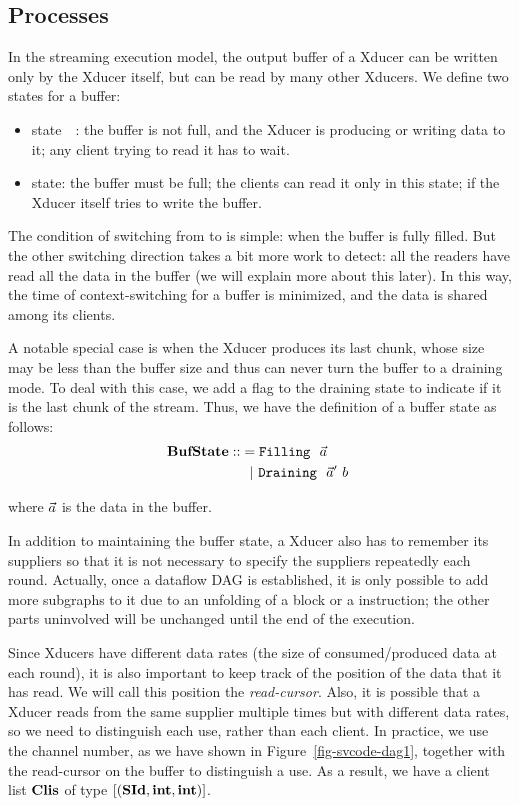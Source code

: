 \subsection{Processes}
In the streaming execution model, the output buffer of a Xducer can be written only by the Xducer itself, but can be read by many other Xducers. 
We define two states for a buffer:
\begin{itemize}
	\item \filling state　: the buffer is not full, and the Xducer is producing or writing data to it; any client trying to read it has to wait.

	\item \draining state: the buffer must be full; the clients can read it only in this state; if the Xducer itself tries to write the buffer.
\end{itemize}

The condition of switching from \filling to \draining is simple: when the buffer is fully filled. 
But the other switching direction takes a bit more work to detect: all the readers have read all the data in the buffer (we will explain more about this later).
In this way, the time of context-switching for a buffer is minimized, and the data is shared among its clients.


A notable special case is when the Xducer produces its last chunk, whose size may be less than the buffer size and thus can never turn the buffer to a draining mode.
To deal with this case, we add a flag to the draining state to indicate if it is the last chunk of the stream. 
Thus, we have the definition of a buffer state as follows:
\begin{align*}
	\mathbf{BufState} :: & = \texttt{Filling} \  \ \vec a \\
	          & \ \ | \ \texttt{Draining} \  \ \vec a' \ b \
\end{align*}

where $\vec a$ is the data in the buffer.

In addition to maintaining the buffer state, a Xducer also has to remember its suppliers so that it is not necessary to specify the suppliers repeatedly each round. 
Actually, once a dataflow DAG is established, it is only possible to add more subgraphs to it due to an unfolding of a \wc block or a \sc instruction; the other parts uninvolved will be unchanged until the end of the execution.


Since Xducers have different data rates (the size of consumed/produced data at each round), it is also important to keep track of the position of the data that it has read.
We will call this position the \emph{read-cursor}.
Also, it is possible that a Xducer reads from the same supplier multiple times but with different data rates, so we need  to distinguish each use, rather than each client. 
In practice, we use the channel number, as we have shown in Figure~\ref{fig-svcode-dag1}, together with the read-cursor on the buffer to distinguish a use.
As a result, we have a client list $\mathbf{Clis}$ of type $[(\mathbf{SId}, \mathbf{int}, \mathbf{int})]$.

